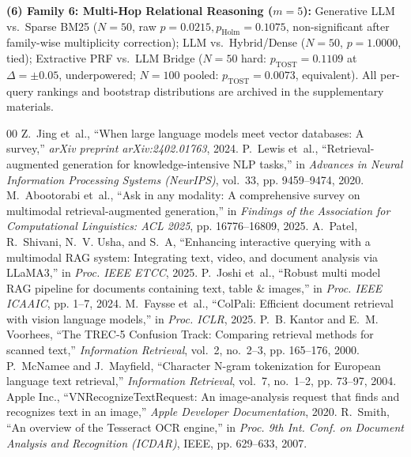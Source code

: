 {\textbf{(6) Family 6: Multi-Hop Relational Reasoning ($m=5$):} Generative LLM vs.\ Sparse BM25 ($N=50$, raw $p=0.0215, p_{\text{Holm}}=0.1075$, non-significant after family-wise multiplicity correction); LLM vs.\ Hybrid/Dense ($N=50$, $p=1.0000$, tied); Extractive PRF vs.\ LLM Bridge ($N=50$ hard: $p_{\text{TOST}}=0.1109$ at $\Delta=\pm 0.05$, underpowered; $N=100$ pooled: $p_{\text{TOST}}=0.0073$, equivalent). All per-query rankings and bootstrap distributions are archived in the supplementary materials.

}

\def\IEEEbibitemsep{-0.8pt plus 0.2pt minus 0.1pt}
\begin{thebibliography}{00}
\scriptsize
\setlength{\itemsep}{0pt}
\setlength{\parskip}{0pt}
\setlength{\parsep}{0pt}
Z.~Jing et~al., ``When large language models meet vector databases: A survey,'' \emph{arXiv preprint arXiv:2402.01763}, 2024.
P.~Lewis et~al., ``Retrieval-augmented generation for knowledge-intensive NLP tasks,'' in \emph{Advances in Neural Information Processing Systems (NeurIPS)}, vol.~33, pp. 9459--9474, 2020.
M.~Abootorabi et~al., ``Ask in any modality: A comprehensive survey on multimodal retrieval-augmented generation,'' in \emph{Findings of the Association for Computational Linguistics: ACL 2025}, pp. 16776--16809, 2025.
A.~Patel, R.~Shivani, N.~V. Usha, and S.~A, ``Enhancing interactive querying with a multimodal RAG system: Integrating text, video, and document analysis via LLaMA3,'' in \emph{Proc. IEEE ETCC}, 2025.
P.~Joshi et~al., ``Robust multi model RAG pipeline for documents containing text, table \& images,'' in \emph{Proc. IEEE ICAAIC}, pp. 1--7, 2024.
M.~Faysse et~al., ``ColPali: Efficient document retrieval with vision language models,'' in \emph{Proc. ICLR}, 2025.
P.~B. Kantor and E.~M. Voorhees, ``The TREC-5 Confusion Track: Comparing retrieval methods for scanned text,'' \emph{Information Retrieval}, vol.~2, no.~2--3, pp. 165--176, 2000.
P.~McNamee and J.~Mayfield, ``Character N-gram tokenization for European language text retrieval,'' \emph{Information Retrieval}, vol.~7, no.~1--2, pp. 73--97, 2004.
Apple Inc., ``VNRecognizeTextRequest: An image-analysis request that finds and recognizes text in an image,'' \emph{Apple Developer Documentation}, 2020.
R.~Smith, ``An overview of the Tesseract OCR engine,'' in \emph{Proc. 9th Int. Conf. on Document Analysis and Recognition (ICDAR)}, IEEE, pp. 629--633, 2007.

\end{thebibliography}
